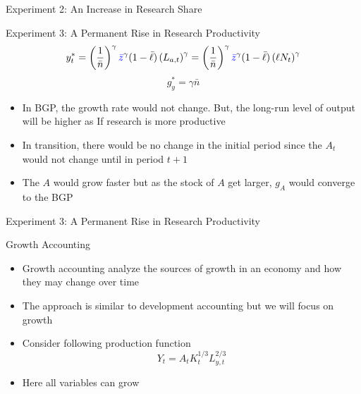 \documentclass[aspectratio=1610]{beamer}
\begin{document}
\begin{frame}[wide]{Experiment 2: An Increase in Research Share }
	\begin{figure}
		\centering
	\end{figure}
\end{frame}

\begin{frame}[wide]{Experiment 3: A Permanent Rise in Research Productivity}
	\[y_t^* = \left(\frac{1}{\bar{n}}\right)^\gamma \textcolor{blue}{\bar{z}}^\gamma  (1-\bar{\ell}) \left( L_{a,t}\right)^\gamma = \left(\frac{1}{\bar{n}}\right)^\gamma \textcolor{blue}{\bar{z}}^\gamma  (1-\bar{\ell}) \left(  \ell N_t \right)^\gamma \]
	\[	g_y^* = \gamma \bar{n} \]
	\begin{itemize}
		\item In BGP, the growth rate would not change. But, the long-run level of output will be higher as If research is more productive
		\item In transition, there would be no change in the initial period since the $A_t$ would not change until in period $t+1$
		\item The $A$ would grow faster but as the stock of $A$ get larger, $g_A$ would converge to the BGP
	\end{itemize}
\end{frame}

\begin{frame}[wide]{Experiment 3: A Permanent Rise in Research Productivity}
	\begin{figure}
		\centering
	\end{figure}
\end{frame}

\begin{frame}[wide]{Growth Accounting}
	\begin{itemize}
		\item Growth accounting analyze the sources of growth in an economy and how they may change over time
		\item The approach is similar to development accounting but we will focus on growth
		\item Consider following production function 
		\[Y_t= A_t K_t^{1/3}L_{y,t}^{2/3}\]
		\item Here all variables can grow
	\end{itemize}
\end{frame}
\end{document}
